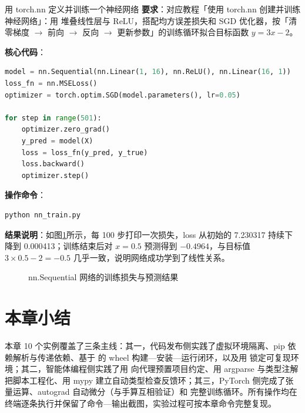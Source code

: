 \begin{exercise}{用 torch.nn 定义并训练一个神经网络}
\textbf{要求}：对应教程「使用 torch.nn 创建并训练神经网络」：用  堆叠线性层与 ReLU，搭配均方误差损失和 SGD 优化器，按「清零梯度 $\rightarrow$ 前向 $\rightarrow$ 反向 $\rightarrow$ 更新参数」的训练循环拟合目标函数 $y=3x-2$。

\textbf{核心代码}：
\begin{lstlisting}[language=Python]
model = nn.Sequential(nn.Linear(1, 16), nn.ReLU(), nn.Linear(16, 1))
loss_fn = nn.MSELoss()
optimizer = torch.optim.SGD(model.parameters(), lr=0.05)

for step in range(501):
    optimizer.zero_grad()
    y_pred = model(X)
    loss = loss_fn(y_pred, y_true)
    loss.backward()
    optimizer.step()
\end{lstlisting}

\textbf{操作命令}：
\begin{lstlisting}
python nn_train.py
\end{lstlisting}

\textbf{结果说明}：如图\ref{fig:ms2-10}所示，每 100 步打印一次损失，loss 从初始的 7.230317 持续下降到 0.000413；训练结束后对 $x=0.5$ 预测得到 $-0.4964$，与目标值 $3\times0.5-2=-0.5$ 几乎一致，说明网络成功学到了线性关系。

\begin{figure}[H]
    \centering
    \caption{nn.Sequential 网络的训练损失与预测结果}
    \label{fig:ms2-10}
\end{figure}
\end{exercise}

\section{本章小结}

本章 10 个实例覆盖了三条主线：其一，代码发布侧实践了虚拟环境隔离、pip 依赖解析与传递依赖、基于  的 wheel 构建—安装—运行闭环，以及用  锁定可复现环境；其二，智能体编程侧实践了用  向代理预置项目约定、用 argparse 与类型注解把脚本工程化、用 mypy 建立自动类型检查反馈环；其三，PyTorch 侧完成了张量运算、autograd 自动微分（与手算互相验证）和  完整训练循环。所有操作均在终端逐条执行并保留了命令—输出截图，实验过程可按本章命令完整复现。
